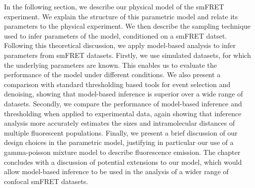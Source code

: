In the following section, we describe our physical model of the smFRET experiment. We explain the structure of this parametric model and relate its parameters to the physical experiment. We then describe the sampling technique used to infer parameters of the model, conditioned on a smFRET datset. Following this theoretical discussion, we apply model-based analysis to infer parameters from smFRET datasets. Firstly, we use simulated datasets, for which the underlying parameters are known. This enables us to evaluate the performance of the model under different conditions. We also present a comparison with standard thresholding based tools for event selection and denoising, showing that model-based inference is superior over a wide range of datasets. Secondly, we compare the performance of model-based inference and thresholding when applied to experimental data, again showing that inference analysis more accurately estimates the sizes and intramolecular distances of multiple fluorescent populations. Finally, we present a brief discussion of our design choices in the parametric model, justifying in particular our use of a gamma-poisson mixture model to describe fluorescence emission. The chapter concludes with a discussion of potential extensions to our model, which would allow model-based inference to be used in the analysis of a wider range of confocal smFRET datasets.   





